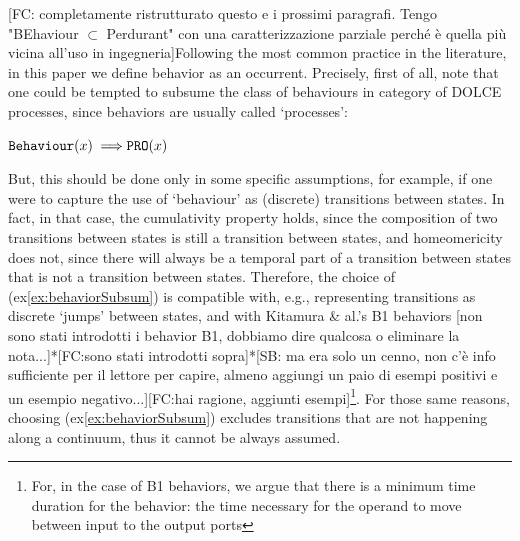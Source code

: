 \documentclass[sw]{iosart2x}
\newcommand{\bflist}{\begin{list}{}{\setlength{\topsep}{2mm}\setlength{\partopsep}{0mm}\setlength{\parsep}{0mm}\setlength{\leftmargin}{9mm}\setlength{\labelwidth}{8mm}}}
\newcommand{\eflist}{\end{list}}
\newcommand{\ExLabel}{\textrm{ex}}
\newcommand{\myex}[1]{\refstepcounter{cntex}\begin{small}{\bf \ExLabel\thecntex\label{ex:#1}}\end{small}}
\newcounter{cntex}
\newcommand{\refex}[1]{({\ExLabel}\ref{#1})}
\newcommand{\generalStyle}[1]{\texttt{#1}}
\newcommand{\uniRel}[2]{\generalStyle{#1}(#2)}
\newcommand{\myfi}{\hspace{0.9mm} \Longrightarrow}
\newcommand{\DOLCE}{\textsc{DOLCE}\xspace} %
\newcommand{\DOLCEProcess}[1]{\uniRel{PRO}{#1}}
\newcommand{\BehaviourConcrete}[1]{\uniRel{Behaviour}{#1}}
\newcommand{\quotes}[1]{`#1'}
\newcommand{\TODO}[1]{{\color{red} #1}}
\begin{document}
\TODO{[FC: completamente ristrutturato questo e i prossimi paragrafi. Tengo "BEhaviour $\subset$ Perdurant" con una caratterizzazione parziale perché è quella più vicina all'uso in ingegneria]}Following the most common practice in the literature, in this paper we define behavior as an occurrent. 
Precisely, first of all, note that one could be tempted to subsume the class of behaviours in category of \DOLCE processes, since behaviors are usually called \quotes{processes}:
\bflist
\item[\myex{behaviorSubsum}] $ \BehaviourConcrete{x} \myfi \DOLCEProcess{x} $
\eflist
But, this should be done only in some specific assumptions, for example, if one were to capture the use of `behaviour' as (discrete) transitions between states.
In fact, in that case, the cumulativity property holds, since the composition of two transitions between states is still a transition between states, and homeomericity does not, since there will always be a temporal part of a transition between states that is not a transition between states. Therefore, the choice of \refex{ex:behaviorSubsum} is compatible with, e.g., representing transitions as discrete `jumps' between states, and with Kitamura \& al.'s B1 behaviors\TODO{[non sono stati introdotti i behavior B1, dobbiamo dire qualcosa o eliminare la nota...]*[FC:sono stati introdotti sopra]*[SB: ma era solo un cenno, non c'è info sufficiente per il lettore per capire, almeno aggiungi un paio di esempi positivi e un esempio negativo...][FC:hai ragione, aggiunti esempi]}\footnote{For, in the case of B1 behaviors, we argue that there is a minimum time duration for the behavior: the time necessary for the operand to move between input to the output ports}. For those same reasons, choosing \refex{ex:behaviorSubsum} excludes transitions that are not happening along a continuum, thus it cannot be always assumed.  
\end{document}
